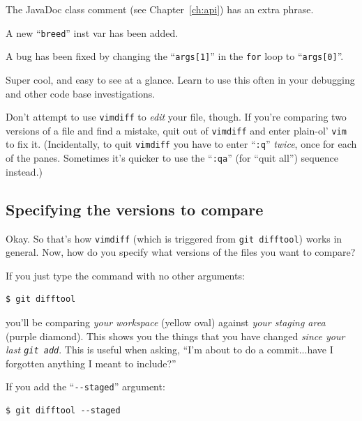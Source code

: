\begin{compactenum}
\item The JavaDoc class comment (see Chapter~\ref{ch:api}) has an extra phrase.
\item A new ``\texttt{breed}'' inst var has been added.
\item A bug has been fixed by changing the ``\texttt{args[1]}'' in the
\texttt{for} loop to ``\texttt{args[0]}''.
\end{compactenum}

Super cool, and easy to see at a glance. Learn to use this often in your
debugging and other code base investigations.

Don't attempt to use \texttt{vimdiff} to \textit{edit} your file, though. If
you're comparing two versions of a file and find a mistake, quit out of
\texttt{vimdiff} and enter plain-ol' \texttt{vim} to fix it. (Incidentally, to
quit \texttt{vimdiff} you have to enter ``\texttt{:q}'' \textit{twice}, once
for each of the panes. Sometimes it's quicker to use the ``\texttt{:qa}'' (for
``quit all'') sequence instead.)

\subsection{Specifying the versions to compare}

Okay. So that's how \texttt{vimdiff} (which is triggered from \texttt{git
difftool}) works in general. Now, how do you specify what versions of the
files you want to compare?

\smallskip
If you just type the command with no other arguments:

\begin{Verbatim}[fontsize=\small,samepage=true,frame=none]
$ git difftool
\end{Verbatim}

you'll be comparing \textit{your workspace} (yellow oval) against \textit{your
staging area} (purple diamond). This shows you the things that you have
changed \textit{since your last \texttt{git add}}. This is useful when asking,
``I'm about to do a commit...have I forgotten anything I meant to include?''

\medskip

If you add the ``\texttt{-{}-staged}'' argument:

\begin{Verbatim}[fontsize=\small,samepage=true,frame=none]
$ git difftool --staged
\end{Verbatim}

